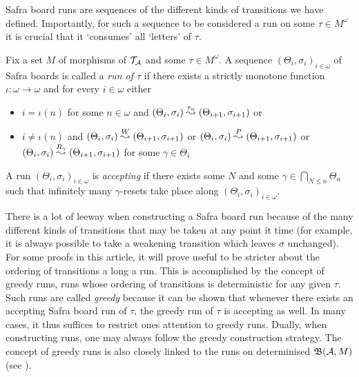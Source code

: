 Safra board runs are sequences of the different kinds of transitions we have
defined. Importantly, for such a sequence to be considered a run on some $\tau
\in M^\omega$ it is crucial that it `consumes' all `letters' of $\tau$.

\begin{definition}
  Fix a set $M$ of morphisms of $\mathcal{T}_{\mathcal{A}}$ and some $\tau \in M^\omega$.
  A sequence $(\Theta_i, \sigma_i)_{i \in \omega}$ of Safra boards is called a
  \emph{run of $\tau$} if there exists a strictly monotone function $\iota :
  \omega \to \omega$ and for every $i \in \omega$ either
  \begin{itemize}
  \item $i = \iota(n)$ for some $n \in \omega$ and $(\Theta_i, \sigma_i)
    \stackrel{\tau_n}{\leadsto} (\Theta_{i + 1}, \sigma_{i + 1})$ or
  \item $i \neq \iota(n)$ and $(\Theta_i, \sigma_i) \stackrel{W}{\leadsto} (\Theta_{i + 1}, \sigma_{i + 1})$ or
  $(\Theta_i, \sigma_i) \stackrel{P}{\leadsto} (\Theta_{i + 1}, \sigma_{i + 1})$ or
  $(\Theta_i, \sigma_i) \stackrel{R_\gamma}{\leadsto} (\Theta_{i + 1}, \sigma_{i + 1})$
    for some $\gamma \in \Theta_i$
  \end{itemize}
  A run $(\Theta_i, \sigma_i)_{i \in \omega}$ is \emph{accepting} if there exists some $N$ and some $\gamma \in
  \bigcap_{N \leq n} \Theta_n$ such that infinitely many $\gamma$-resets take
  place along $(\Theta_i, \sigma_i)_{i \in \omega}$.
\end{definition}

There is a lot of leeway when constructing a Safra board run because of the many
different kinds of transitions that may be taken at any point it time (for
example, it is always possible to take a weakening transition which leaves
$\sigma$ unchanged). For some proofs in this article, it will prove useful
to be stricter about the ordering of transitions a long a run. This is
accomplished by the concept of greedy runs, runs whose ordering of transitions
is deterministic for any given $\tau$. Such runs are called
\textit{greedy} because it can be shown that whenever there exists an accepting
Safra board run of $\tau$, the greedy run of $\tau$ is accepting as well. In
many cases, it thus suffices to restrict ones attention to greedy runs. Dually,
when constructing runs, one may always follow the greedy construction strategy.
The concept of greedy runs is also closely linked to the runs on determinised
$\mathfrak{B}(\mathcal{A}, M)$ (see ).

